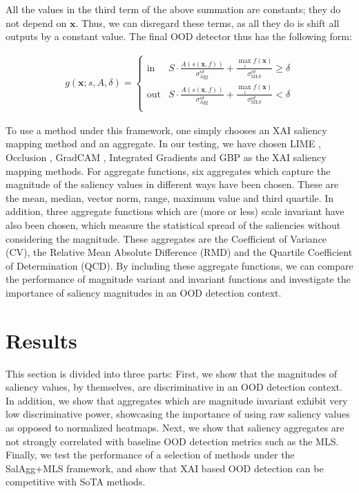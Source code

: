 \documentclass[runningheads]{llncs}
\begin{document}
\noindent All the values in the third term of the above summation are constants; they do not depend on $\bm{x}$. Thus, we can disregard these terms, as all they do is shift all outputs by a constant value. The final OOD detector thus has the following form:

\begin{align}
    g(\bm{x}; s, A, \delta)=\begin{cases}
    \text{in } &  S \cdot \frac{A(s(\bm{x}, f))}{\sigma_{\text{Agg}}^{id}} + \frac{\max_i f(\bm{x})}{\sigma_{\text{MLS}}^{id}} \ge \delta \\[10pt]
    \text{out} &  S \cdot \frac{A(s(\bm{x}, f))}{\sigma_{\text{Agg}}^{id}} + \frac{\max_i f(\bm{x})}{\sigma_{\text{MLS}}^{id}} < \delta \\[10pt]
   \end{cases}
\label{eq:aggregate}
\end{align}

To use a method under this framework, one simply chooses an XAI saliency mapping method and an aggregate. In our testing, we have chosen LIME \cite{lime}, Occlusion \cite{occlusion}, GradCAM \cite{gradcam}, Integrated Gradients \cite{integratedgradients} and GBP \cite{gbp} as the XAI saliency mapping methods. For aggregate functions, six aggregates which capture the magnitude of the saliency values in different ways have been chosen. These are the mean, median, vector norm, range, maximum value and third quartile. In addition, three aggregate functions which are (more or less) scale invariant have also been chosen, which measure the statistical spread of the saliencies without considering the magnitude. These aggregates are the Coefficient of Variance (CV), the Relative Mean Absolute Difference (RMD) and the Quartile Coefficient of Determination (QCD). By including these aggregate functions, we can compare the performance of magnitude variant and invariant functions and investigate the importance of saliency magnitudes in an OOD detection context.

\section{Results} \label{section:results}

This section is divided into three parts: First, we show that the magnitudes of saliency values, by themselves, are discriminative in an OOD detection context. In addition, we show that aggregates which are magnitude invariant exhibit very low discriminative power, showcasing the importance of using raw saliency values as opposed to normalized heatmaps. Next, we show that saliency aggregates are not strongly correlated with baseline OOD detection metrics such as the MLS. Finally, we test the performance of a selection of methods under the SalAgg+MLS framework, and show that XAI based OOD detection can be competitive with SoTA methods.
\end{document}
